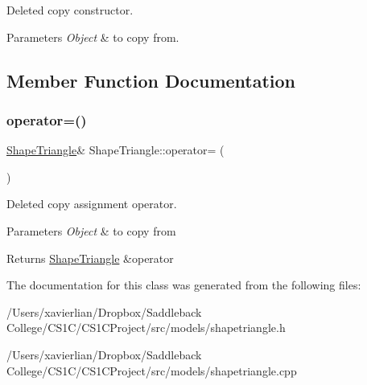 Deleted copy constructor. 


\begin{DoxyParams}{Parameters}
{\em Object} & to copy from. \\
\hline
\end{DoxyParams}


\subsection{Member Function Documentation}
\mbox{\label{class_shape_triangle_a4e97313348c0e825621cff5193e5d1a8}} 
\subsubsection{\texorpdfstring{operator=()}{operator=()}}
{\footnotesize\ttfamily \mbox{\hyperlink{class_shape_triangle}{Shape\+Triangle}}\& Shape\+Triangle\+::operator= (\begin{DoxyParamCaption}\item[{const \mbox{\hyperlink{class_shape_triangle}{Shape\+Triangle}} \&}]{ }\end{DoxyParamCaption})\hspace{0.3cm}{\ttfamily [delete]}}



Deleted copy assignment operator. 


\begin{DoxyParams}{Parameters}
{\em Object} & to copy from \\
\hline
\end{DoxyParams}
\begin{DoxyReturn}{Returns}
\mbox{\hyperlink{class_shape_triangle}{Shape\+Triangle}} \&operator 
\end{DoxyReturn}


The documentation for this class was generated from the following files\+:\begin{DoxyCompactItemize}
\item 
/\+Users/xavierlian/\+Dropbox/\+Saddleback College/\+C\+S1\+C/\+C\+S1\+C\+Project/src/models/shapetriangle.\+h\item 
/\+Users/xavierlian/\+Dropbox/\+Saddleback College/\+C\+S1\+C/\+C\+S1\+C\+Project/src/models/shapetriangle.\+cpp\end{DoxyCompactItemize}
